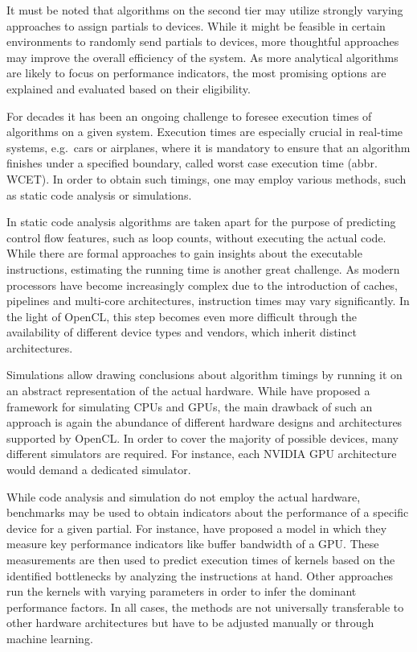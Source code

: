 It must be noted that algorithms on the second tier may utilize strongly varying approaches to assign partials to devices. While it might be feasible in certain environments to randomly send partials to devices, more thoughtful approaches may improve the overall efficiency of the system. As more analytical algorithms are likely to focus on performance indicators, the most promising options are explained and evaluated based on their eligibility.

For decades it has been an ongoing challenge to foresee execution times of algorithms on a given system. Execution times are especially crucial in real-time systems, e.g.~cars or airplanes, where it is mandatory to ensure that an algorithm finishes under a specified boundary, called worst case execution time (abbr. WCET). In order to obtain such timings, one may employ various methods, such as static code analysis or simulations\cite{wcet}.

In static code analysis algorithms are taken apart for the purpose of predicting control flow features, such as loop counts, without executing the actual code\cite{loopbound}\cite{sweet}. While there are formal approaches to gain insights about the executable instructions, estimating the running time is another great challenge. As modern processors have become increasingly complex due to the introduction of caches, pipelines and multi-core architectures, instruction times may vary significantly\cite{wcet}. In the light of OpenCL, this step becomes even more difficult through the availability of different device types and vendors, which inherit distinct architectures.

Simulations allow drawing conclusions about algorithm timings by running it on an abstract representation of the actual hardware\cite{wcet}. While \citeauthor{multi2sim} have proposed a framework for simulating CPUs and GPUs\cite{multi2sim}, the main drawback of such an approach is again the abundance of different hardware designs and architectures supported by OpenCL. In order to cover the majority of possible devices, many different simulators are required. For instance, each NVIDIA GPU architecture would demand a dedicated simulator.

While code analysis and simulation do not employ the actual hardware, benchmarks may be used to obtain indicators about the performance of a specific device for a given partial. For instance, \citeauthor{quantitative_performance} have proposed a model in which they measure key performance indicators like buffer bandwidth of a GPU\cite{quantitative_performance}. These measurements are then used to predict execution times of kernels based on the identified bottlenecks by analyzing the instructions at hand. Other approaches run the kernels with varying parameters in order to infer the dominant performance factors\cite{gpgpu_performance}. In all cases, the methods are not universally transferable to other hardware architectures but have to be adjusted manually or through machine learning.

